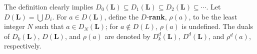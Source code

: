 The definition clearly implies 
$D_0(\mathbf L) \subseteq D_1(\mathbf L) \subseteq D_2(\mathbf L) \subseteq \cdots$.  
Let $D(\mathbf L) = \bigcup D_i$. For $a \in D(\mathbf L)$, define the $D$-\textbf{rank}, $\rho(a)$, 
to be the least integer $N$ such that $a \in D_N(\mathbf L)$; for $a \notin D(L)$, 
$\rho (a)$ is undefined. 
The duals of $D_k(\mathbf L)$, $D(\mathbf L)$, and $\rho(a)$ are denoted by $D^d_k(\mathbf L)$, 
$D^d(\mathbf L)$, and $\rho^d(a)$, respectively.

\newpage

